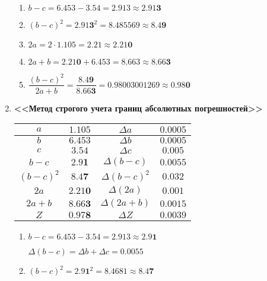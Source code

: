 \documentclass[a4paper, 14pt, fleqn]{extarticle}
\begin{document}
\begin{enumerate}
					\begin{enumerate}[label*=\arabic*.]
						\item \( b - c = 6.453 - 3.54 = 2.913 \approx 2.91\mathbf{3} \)
						\item \( (b - c)^2 = 2.91\mathbf{3}^2 = 8.485569 \approx 8.4\mathbf{9} \)
						\item \( 2a = 2 \cdot 1.105 = 2.21 \approx 2.21\mathbf{0} \) 
						\item \( 2a + b  = 2.21\mathbf{0} + 6.453 = 8.663 \approx 8.66\mathbf{3} \)
						\item \( \dfrac{(b-c)^2}{2a+b} = \dfrac{8.4\mathbf{9}}{8.66\mathbf{3}} = 0.98003001269 \approx 0.98\mathbf{0} \)  
					\end{enumerate}
				\pagebreak
				\item \textbf{<<Метод строгого учета границ абсолютных погрешностей>>}
					\begin{center}
						\begin{tabular}{| c | c | c | c |}
							\hline
							\( a \) & \( 1.105 \) &\( \Delta a \) & \( 0.0005 \) \\
							\hline
							\( b \) & \( 6.453 \) & \( \Delta b \) & \( 0.0005 \) \\
							\hline
							\( c \) & \( 3.54 \) & \( \Delta c \) & \( 0.005 \) \\
							\hline
							\( b - c \) & \( 2.9\mathbf{1} \) & \( \Delta (b - c) \) & \( 0.0055 \) \\
							\hline
							\( (b - c)^2 \) & \( 8.4\mathbf{7} \) & \( \Delta (b - c)^2 \)  & \( 0.032 \) \\
							\hline
							\( 2a \) & \( 2.21\mathbf{0} \) & \( \Delta (2a) \) & \( 0.001 \) \\
							\hline
							\( 2a + b\) & \( 8.66\mathbf{3} \) & \( \Delta (2a + b) \) & \( 0.0015 \) \\
							\hline
							\( Z \) & \( 0.97\mathbf{8} \) & \( \Delta Z \) & \( 0.0039 \) \\
							\hline
						\end{tabular}
					\end{center}
					\begin{enumerate}[label*=\arabic*.]
						\item \( b - c = 6.453 - 3.54 = 2.913 \approx 2.9\mathbf{1} \)

							\( \Delta(b-c) = \Delta b + \Delta c = 0.0055 \)

						\item \( (b - c)^2 = 2.9\mathbf{1}^2 = 8.4681 \approx 8.4\mathbf{7} \)


\end{enumerate}
\end{enumerate}
\end{document}
